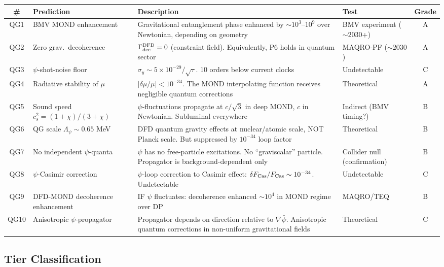 \documentclass[11pt,a4paper]{article}
\begin{document}
\begin{center}
\begin{longtable}{clp{5cm}lc}
\toprule
\textbf{\#} & \textbf{Prediction} & \textbf{Description} & \textbf{Test} & \textbf{Grade} \\
\midrule
\endfirsthead
QG1 & BMV MOND enhancement & Gravitational entanglement phase enhanced by $\sim 10^3$--$10^9$ over Newtonian, depending on geometry & BMV experiment ($\sim 2030$+) & A \\
QG2 & Zero grav.\ decoherence & $\Gamma_{\rm dec}^{\rm DFD} = 0$ (constraint field). Equivalently, P6 holds in quantum sector & MAQRO-PF ($\sim 2030$) & A \\
QG3 & $\psi$-shot-noise floor & $\sigma_y \sim 5\times 10^{-29}/\sqrt{\tau}$. 10 orders below current clocks & Undetectable & C \\
QG4 & Radiative stability of $\mu$ & $|\delta\mu/\mu| < 10^{-34}$. The MOND interpolating function receives negligible quantum corrections & Theoretical & A \\
QG5 & Sound speed $c_s^2 = (1+\chi)/(3+\chi)$ & $\psi$-fluctuations propagate at $c/\sqrt{3}$ in deep MOND, $c$ in Newtonian. Subluminal everywhere & Indirect (BMV timing?) & B \\
QG6 & QG scale $\Lambda_\psi \sim 0.65$ MeV & DFD quantum gravity effects at nuclear/atomic scale, NOT Planck scale. But suppressed by $10^{-34}$ loop factor & Theoretical & B \\
QG7 & No independent $\psi$-quanta & $\psi$ has no free-particle excitations. No ``graviscalar'' particle. Propagator is background-dependent only & Collider null (confirmation) & B \\
QG8 & $\psi$-Casimir correction & $\psi$-loop correction to Casimir effect: $\delta F_{\rm Cas}/F_{\rm Cas} \sim 10^{-34}$. Undetectable & Undetectable & C \\
QG9 & DFD-MOND decoherence enhancement & IF $\psi$ fluctuates: decoherence enhanced $\sim 10^4$ in MOND regime over DP & MAQRO/TEQ & B \\
QG10 & Anisotropic $\psi$-propagator & Propagator depends on direction relative to $\nabla\bar\psi$. Anisotropic quantum corrections in non-uniform gravitational fields & Theoretical & C \\
\bottomrule
\end{longtable}
\end{center}

\subsection{Tier Classification}
\end{document}
